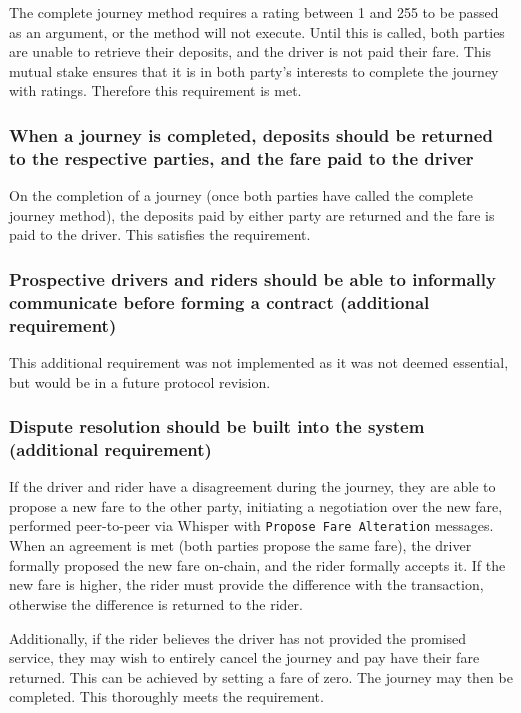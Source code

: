 The complete journey method requires a rating between 1 and 255 to be passed as an argument, or the method will not execute. Until this is called, both parties are unable to retrieve their deposits, and the driver is not paid their fare. This mutual stake ensures that it is in both party's interests to complete the journey with ratings. Therefore this requirement is met.

\subsubsection*{When a journey is completed, deposits should be returned to the respective parties, and the fare paid to the driver}

On the completion of a journey (once both parties have called the complete journey method), the deposits paid by either party are returned and the fare is paid to the driver. This satisfies the requirement.

\subsubsection*{Prospective drivers and riders should be able to informally communicate before forming a contract (additional requirement)}

This additional requirement was not implemented as it was not deemed essential, but would be in a future protocol revision.

\subsubsection*{Dispute resolution should be built into the system (additional requirement)}

If the driver and rider have a disagreement during the journey, they are able to propose a new fare to the other party, initiating a negotiation over the new fare, performed peer-to-peer via Whisper with \lstinline{Propose Fare Alteration} messages. When an agreement is met (both parties propose the same fare), the driver formally proposed the new fare on-chain, and the rider formally accepts it. If the new fare is higher, the rider must provide the difference with the transaction, otherwise the difference is returned to the rider.

Additionally, if the rider believes the driver has not provided the promised service, they may wish to entirely cancel the journey and pay have their fare returned. This can be achieved by setting a fare of zero. The journey may then be completed. This thoroughly meets the requirement.
